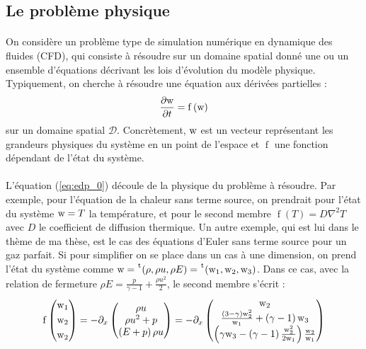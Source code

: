 	\subsection{Le problème physique}

		\paragraph{}
		On considère un problème type de simulation numérique en dynamique des fluides (CFD), qui consiste à résoudre sur un domaine spatial donné une ou un ensemble d'équations décrivant les lois d'évolution du modèle physique.
		Typiquement, on cherche à résoudre une équation aux dérivées partielles :
		\begin{equation}\label{eq:edp_0}
			\frac{\partial\textup{w}}{\partial t} = \operatorname{f}\left(\textup{w}\right)
		\end{equation}
		sur un domaine spatial $\mathcal{D}$.
		Concrètement, $\textup{w}$ est un vecteur représentant les grandeurs physiques du système en un point de l'espace et $\operatorname{f}$ une fonction dépendant de l'état du système.

		\paragraph{}
		L'équation (\ref{eq:edp_0}) découle de la physique du problème à résoudre.
		Par exemple, pour l'équation de la chaleur sans terme source, on prendrait pour l'état du système $\textup{w} = T$ la température, et pour le second membre $\operatorname{f}\left(T\right) = D\nabla^2T$ avec $D$ le coefficient de diffusion thermique.
		Un autre exemple, qui est lui dans le thème de ma thèse, est le cas des équations d'Euler sans terme source pour un gaz parfait.
		Si pour simplifier on se place dans un cas à une dimension, on prend l'état du système comme $\textup{w} = \mskip1mu\prescript{\smash{\mathrm t\mkern-3mu}}{}{\mathstrut\left(\rho, \rho u, \rho E\right)} = \mskip1mu\prescript{\smash{\mathrm t\mkern-3mu}}{}{\mathstrut\left(\textup{w}_1, \textup{w}_2, \textup{w}_3\right)}$.
		Dans ce cas, avec la relation de fermeture $\rho E = \frac{p}{\gamma - 1} + \frac{\rho u^2}{2}$, le second membre s'écrit :
		\[\operatorname{f}\left(\begin{aligned}\textup{w}_1\\\textup{w}_2\\\textup{w}_2\end{aligned}\right)
			= -\partial_x\begin{pmatrix}
				\rho u\\
				\rho u^2 + p\\
				\left(E + p\right)\rho u
				\end{pmatrix}
			= -\partial_x\begin{pmatrix}
				\textup{w}_2\\
				\frac{\left(3 - \gamma\right)\textup{w}_2^2}{\textup{w}_1} + \left(\gamma - 1\right)\textup{w}_3\\
				\left(\gamma\textup{w}_3 - \left(\gamma - 1\right)\frac{\textup{w}_2^2}{2\textup{w}_1}\right)\frac{\textup{w}_2}{\textup{w}_1}
			\end{pmatrix}
		\]

